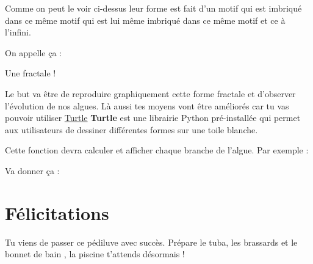 \documentclass[a4paper, 12pt]{article}
\begin{document}
{    
    
    Comme on peut le voir ci-dessus leur forme est fait d'un motif qui est imbriqué dans ce même motif qui est
    lui même imbriqué dans ce même motif et ce à l'infini.
    
    \vspace{3cm}

    On appelle ça :
    \begin{center}
        {\huge Une fractale !}
    \end{center}
    \vspace{0.5cm}


    Le but va être de reproduire graphiquement cette forme fractale et d'observer l'évolution de nos algues.
    Là aussi tes moyens vont être améliorés car tu vas pouvoir utiliser \href{https://docs.python.org/fr/3/library/turtle.html}{Turtle}
    \newline \newline
    \textbf{Turtle} est une librairie Python pré-installée qui permet aux utilisateurs de dessiner différentes formes sur une toile blanche.



    Cette fonction devra calculer et afficher chaque branche de l'algue.
    \newline \newline
    Par exemple :

    Va donner ça :


}

\vspace{5cm}

\section{Félicitations}

{\comfortaa
    Tu viens de passer ce pédiluve avec succès. Prépare le tuba, les brassards et le bonnet de bain
    , la piscine t'attends désormais !

}
\end{document}
